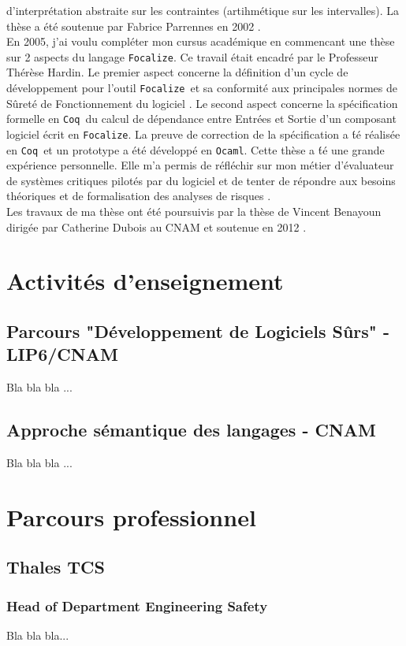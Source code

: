 \documentclass[a4paper,12pt]{article}
\newcommand{\Coq}{{\tt Coq}}
\newcommand{\Ocaml}{{\tt Ocaml}}
\newcommand{\Focal}{{\tt Focalize}}
\begin{document}
d'interpr\'etation abstraite sur les contraintes (artihm\'etique sur
les intervalles).  La th\`ese a \'et\'e soutenue par Fabrice Parrennes
en 2002 \cite{Phd-FParrennes}.
\\
En 2005, j'ai voulu compl\'eter mon cursus acad\'emique en
commencant une th\`ese sur 2 aspects du langage \Focal. Ce travail
\'etait encadr\'e par le Professeur Th\'er\`ese Hardin. Le premier
aspect concerne la d\'efinition d'un cycle de d\'eveloppement pour
l'outil \Focal\ et sa conformit\'e aux principales normes de
S\^uret\'e de Fonctionnement du logiciel \cite{TAP09, TTSS08}. Le
second aspect concerne la sp\'ecification formelle en \Coq\ du calcul
de d\'ependance entre Entr\'ees et Sortie d'un composant logiciel
\'ecrit en \Focal. La preuve de correction de la sp\'ecification a
\'t\'e r\'ealis\'ee en \Coq\ et un prototype a \'et\'e d\'evelopp\'e
en \Ocaml. Cette th\`ese a \'t\'e une grande exp\'erience
personnelle. Elle m'a permis de r\'efl\'echir sur mon m\'etier
d'\'evaluateur de syst\`emes critiques pilot\'es par du logiciel et de
tenter de r\'epondre aux besoins th\'eoriques et de formalisation des
analyses de risques \cite{Phd-PAyrault}.
\\
Les travaux de ma th\`ese ont \'et\'e poursuivis par la th\`ese de Vincent
Benayoun dirig\'ee par Catherine Dubois au CNAM et soutenue en 2012
\cite{Phd-VBenayoun, SEFM2012}.

\section{Activit\'es d'enseignement}
\subsection{Parcours "D\'eveloppement de Logiciels S\^urs" - LIP6/CNAM}
Bla bla bla ...

\subsection{Approche s\'emantique des langages - CNAM}
Bla bla bla ...


\newpage
\section{Parcours professionnel}
\subsection{Thales TCS}
\subsubsection{Head of Department Engineering Safety}
Bla bla bla...
\end{document}
